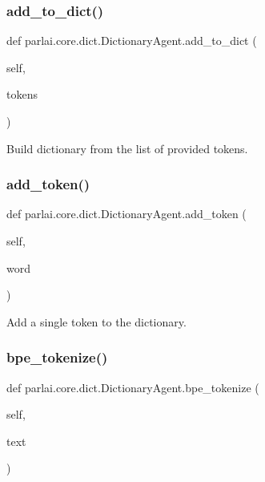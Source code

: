 \subsubsection{\texorpdfstring{add\+\_\+to\+\_\+dict()}{add\_to\_dict()}}
{\footnotesize\ttfamily def parlai.\+core.\+dict.\+Dictionary\+Agent.\+add\+\_\+to\+\_\+dict (\begin{DoxyParamCaption}\item[{}]{self,  }\item[{}]{tokens }\end{DoxyParamCaption})}

\begin{DoxyVerb}Build dictionary from the list of provided tokens.
\end{DoxyVerb}
 \mbox{\label{classparlai_1_1core_1_1dict_1_1DictionaryAgent_aec44508e4b501214618e24d86a4a51df}} 
\subsubsection{\texorpdfstring{add\+\_\+token()}{add\_token()}}
{\footnotesize\ttfamily def parlai.\+core.\+dict.\+Dictionary\+Agent.\+add\+\_\+token (\begin{DoxyParamCaption}\item[{}]{self,  }\item[{}]{word }\end{DoxyParamCaption})}

\begin{DoxyVerb}Add a single token to the dictionary.
\end{DoxyVerb}
 \mbox{\label{classparlai_1_1core_1_1dict_1_1DictionaryAgent_a520e4bc630cd60f075ad21632ef677a1}} 
\subsubsection{\texorpdfstring{bpe\+\_\+tokenize()}{bpe\_tokenize()}}
{\footnotesize\ttfamily def parlai.\+core.\+dict.\+Dictionary\+Agent.\+bpe\+\_\+tokenize (\begin{DoxyParamCaption}\item[{}]{self,  }\item[{}]{text }\end{DoxyParamCaption})}

